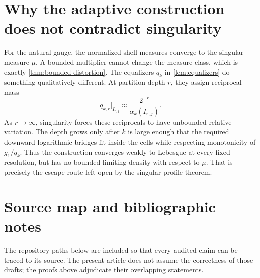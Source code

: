 \documentclass[11pt,oneside]{article}
\theoremstyle{definition}
\theoremstyle{remark}
\begin{document}
\section{Why the adaptive construction does not contradict singularity}
\label{app:no-contradiction}

For the natural gauge, the normalized shell measures converge to the singular
measure \(\mu\).  A bounded multiplier cannot change the measure class, which
is exactly \cref{thm:bounded-distortion}.  The equalizers
\(q_k\) in \cref{lem:equalizers} do something qualitatively different.  At
partition depth \(r\), they assign reciprocal mass
\[
 q_{k,r}|_{I_{r,j}}\approx\frac{2^{-r}}{\alpha_k(I_{r,j})}.
\]
As \(r\to\infty\), singularity forces these reciprocals to have unbounded
relative variation.  The depth grows only after \(k\) is large enough that the
required downward logarithmic bridges fit inside the cells while respecting
monotonicity of \(g_1/q_k\).  Thus the construction converges weakly to
Lebesgue at every fixed resolution, but has no bounded limiting density with
respect to \(\mu\).  That is precisely the escape route left open by the
singular-profile theorem.

\section{Source map and bibliographic notes}
\label{app:sources}

The repository paths below are included so that every audited claim can be
traced to its source.  The present article does not assume the correctness of
those drafts; the proofs above adjudicate their overlapping statements.
\end{document}
